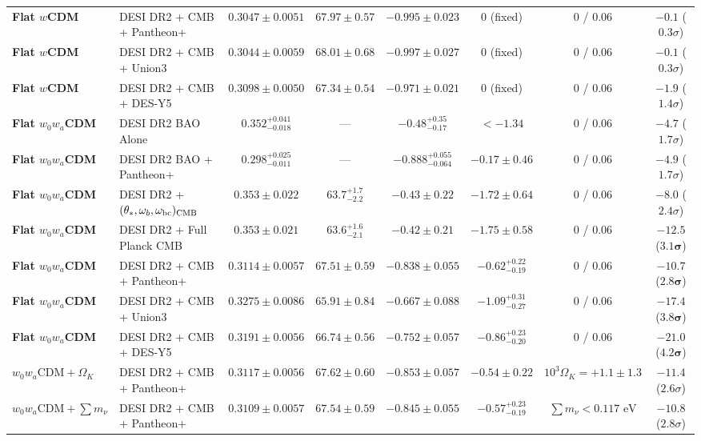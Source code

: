 \documentclass[11pt,letterpaper]{article}
\begin{document}
\begin{table}[!htbp]
{\begin{tabular}{llcccccc}
\textbf{Flat $w$CDM} & DESI DR2 + CMB + Pantheon+ & $0.3047 \pm 0.0051$ & $67.97 \pm 0.57$ & $-0.995 \pm 0.023$ & $0$ (fixed) & $0$ / $0.06$ & $-0.1$ ($0.3\sigma$) \\
\textbf{Flat $w$CDM} & DESI DR2 + CMB + Union3 & $0.3044 \pm 0.0059$ & $68.01 \pm 0.68$ & $-0.997 \pm 0.027$ & $0$ (fixed) & $0$ / $0.06$ & $-0.1$ ($0.3\sigma$) \\
\textbf{Flat $w$CDM} & DESI DR2 + CMB + DES-Y5 & $0.3098 \pm 0.0050$ & $67.34 \pm 0.54$ & $-0.971 \pm 0.021$ & $0$ (fixed) & $0$ / $0.06$ & $-1.9$ ($1.4\sigma$) \\
\midrule
\textbf{Flat $w_0 w_a$CDM} & DESI DR2 BAO Alone & $0.352^{+0.041}_{-0.018}$ & --- & $-0.48^{+0.35}_{-0.17}$ & $< -1.34$ & $0$ / $0.06$ & $-4.7$ ($1.7\sigma$) \\
\textbf{Flat $w_0 w_a$CDM} & DESI DR2 BAO + Pantheon+ & $0.298^{+0.025}_{-0.011}$ & --- & $-0.888^{+0.055}_{-0.064}$ & $-0.17 \pm 0.46$ & $0$ / $0.06$ & $-4.9$ ($1.7\sigma$) \\
\textbf{Flat $w_0 w_a$CDM} & DESI DR2 + $(\theta_*,\omega_b,\omega_{\rm bc})_{\rm CMB}$ & $0.353 \pm 0.022$ & $63.7^{+1.7}_{-2.2}$ & $-0.43 \pm 0.22$ & $-1.72 \pm 0.64$ & $0$ / $0.06$ & $-8.0$ ($2.4\sigma$) \\
\textbf{Flat $w_0 w_a$CDM} & DESI DR2 + Full Planck CMB & $0.353 \pm 0.021$ & $63.6^{+1.6}_{-2.1}$ & $-0.42 \pm 0.21$ & $-1.75 \pm 0.58$ & $0$ / $0.06$ & $-12.5$ ($\mathbf{3.1}\boldsymbol{\sigma}$) \\
\textbf{Flat $w_0 w_a$CDM} & DESI DR2 + CMB + Pantheon+ & $0.3114 \pm 0.0057$ & $67.51 \pm 0.59$ & $-0.838 \pm 0.055$ & $-0.62^{+0.22}_{-0.19}$ & $0$ / $0.06$ & $-10.7$ ($\mathbf{2.8}\boldsymbol{\sigma}$) \\
\textbf{Flat $w_0 w_a$CDM} & DESI DR2 + CMB + Union3 & $0.3275 \pm 0.0086$ & $65.91 \pm 0.84$ & $-0.667 \pm 0.088$ & $-1.09^{+0.31}_{-0.27}$ & $0$ / $0.06$ & $-17.4$ ($\mathbf{3.8}\boldsymbol{\sigma}$) \\
\textbf{Flat $w_0 w_a$CDM} & DESI DR2 + CMB + DES-Y5 & $0.3191 \pm 0.0056$ & $66.74 \pm 0.56$ & $-0.752 \pm 0.057$ & $-0.86^{+0.23}_{-0.20}$ & $0$ / $0.06$ & $-21.0$ ($\mathbf{4.2}\boldsymbol{\sigma}$) \\
\textbf{$w_0 w_a\text{CDM} + \Omega_K$} & DESI DR2 + CMB + Pantheon+ & $0.3117 \pm 0.0056$ & $67.62 \pm 0.60$ & $-0.853 \pm 0.057$ & $-0.54 \pm 0.22$ & $10^3\Omega_K = +1.1 \pm 1.3$ & $-11.4$ ($2.6\sigma$) \\
\textbf{$w_0 w_a\text{CDM} + \sum m_\nu$} & DESI DR2 + CMB + Pantheon+ & $0.3109 \pm 0.0057$ & $67.54 \pm 0.59$ & $-0.845 \pm 0.055$ & $-0.57^{+0.23}_{-0.19}$ & $\sum m_\nu < 0.117\text{ eV}$ & $-10.8$ ($2.8\sigma$) \\

\end{tabular}}
\end{table}
\end{document}
